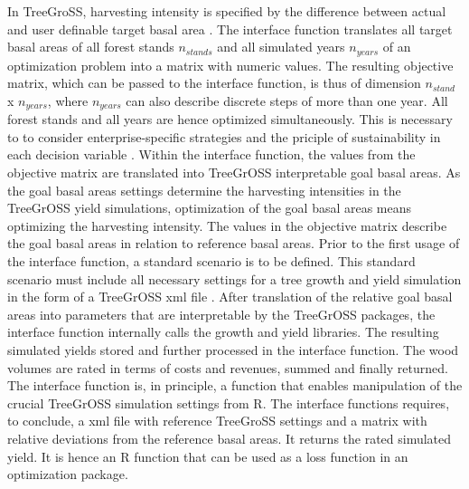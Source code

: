 In TreeGroSS, harvesting intensity is specified by the difference between actual and user definable target basal area \citep[p. 149-150]{hansen_2014}. The interface function translates all target basal areas of all forest stands $n_{stands}$ and all simulated years $n_{years}$ of an optimization problem into a matrix with numeric values. The resulting objective matrix, which can be passed to the interface function, is thus of dimension $n_{stand}$ x $n_{years}$, where $n_{years}$ can also describe discrete steps of more than one year. All forest stands and all years are hence optimized simultaneously. This is necessary to to consider enterprise-specific strategies and the priciple of sustainability in each decision variable \citep[p. 351]{mohring_2010}. Within the interface function, the values from the objective matrix are translated into TreeGrOSS interpretable goal basal areas. As the goal basal areas settings determine the harvesting intensities in the TreeGrOSS yield simulations, optimization of the goal basal areas means optimizing the harvesting intensity. The values in the objective matrix describe the goal basal areas in relation to reference basal areas. Prior to the first usage of the interface function, a standard scenario is to be defined. This standard scenario must include all necessary settings for a tree growth and yield simulation in the form of a TreeGrOSS xml file \citep[p. 30]{hansen_2014}. After translation of the relative goal basal areas into parameters that are interpretable by the TreeGrOSS packages, the interface function internally calls the growth and yield libraries. The resulting simulated yields stored and further processed in the interface function. The wood volumes are rated in terms of costs and revenues, summed and finally returned. The interface function is, in principle, a function that enables manipulation of the crucial TreeGrOSS simulation settings from R. The interface functions requires, to conclude, a xml file with reference TreeGroSS settings and a matrix with relative deviations from the reference basal areas. It returns the rated simulated yield. It is hence an R function that can be used as a loss function in an optimization package.


